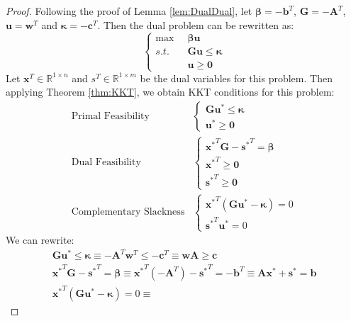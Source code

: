 \begin{proof} Following the proof of Lemma \ref{lem:DualDual}, let $\boldsymbol{\beta} = -\mathbf{b}^T$, $\mathbf{G} = -\mathbf{A}^T$, $\mathbf{u} = \mathbf{w}^T$ and $\boldsymbol{\kappa} = -\mathbf{c}^T$. Then the dual problem can be rewritten as:
\begin{displaymath}
\left\{
\begin{aligned}
\max\;\; & \boldsymbol{\beta}\mathbf{u}\\
s.t.\;\; & \mathbf{G}\mathbf{u} \leq \boldsymbol{\kappa}\\
& \mathbf{u} \geq \mathbf{0}
\end{aligned}\right.
\end{displaymath}
Let $\mathbf{x}^T \in \mathbb{R}^{1 \times n}$ and $s^T \in \mathbb{R}^{1 \times m}$ be the dual variables for this problem. Then applying Theorem \ref{thm:KKT}, we obtain KKT conditions for this problem:
\begin{align}
\text{Primal Feasibility}&\left\{ 
\begin{aligned}
\mathbf{G}\mathbf{u}^* \leq \boldsymbol{\kappa}\\
\mathbf{u}^* \geq \mathbf{0}
\end{aligned}\right.\\
\text{Dual Feasibility}&\left\{ 
\begin{aligned}
{\mathbf{x}^*}^T\mathbf{G} - {\mathbf{s}^*}^T = \boldsymbol{\beta}\\
{\mathbf{x}^*}^T \geq \mathbf{0}\\
{\mathbf{s}^*}^T \geq \mathbf{0}
\end{aligned}\right.\\
\text{Complementary Slackness}&\left\{ 
\begin{aligned}
{\mathbf{x}^*}^T\left(\mathbf{G}\mathbf{u}^* - \boldsymbol{\kappa}\right) = 0\\
{\mathbf{s}^*}^T\mathbf{u}^* = 0
\end{aligned}\right.
\end{align}
We can rewrite:
\begin{gather*}
\mathbf{G}\mathbf{u}^* \leq \boldsymbol{\kappa} \equiv -\mathbf{A}^T\mathbf{w}^T \leq -\mathbf{c}^T \equiv \mathbf{w}\mathbf{A} \geq \mathbf{c}\\
{\mathbf{x}^*}^T\mathbf{G} - {\mathbf{s}^*}^T = \boldsymbol{\beta} \equiv
{\mathbf{x}^*}^T(-\mathbf{A}^T) - {\mathbf{s}^*}^T = -\mathbf{b}^T \equiv
\mathbf{A}\mathbf{x}^* + \mathbf{s}^* = \mathbf{b}\\
{\mathbf{x}^*}^T\left(\mathbf{G}\mathbf{u}^* - \boldsymbol{\kappa}\right) = 0 \equiv

\end{gather*}
\end{proof}
